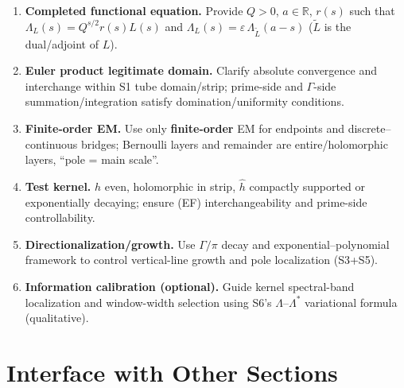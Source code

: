 \documentclass[11pt,a4paper]{article}
\theoremstyle{remark}
\begin{document}
\begin{enumerate}
\item \textbf{Completed functional equation.} Provide $Q>0$, $a\in\mathbb{R}$, $r(s)$ such that $\Lambda_{L}(s)=Q^{s/2}r(s)L(s)$ and $\Lambda_{L}(s)=\varepsilon\,\Lambda_{\tilde{L}}(a-s)$ ($\tilde{L}$ is the dual/adjoint of $L$).

\item \textbf{Euler product legitimate domain.} Clarify absolute convergence and interchange within S1 tube domain/strip; prime-side and $\Gamma$-side summation/integration satisfy domination/uniformity conditions.

\item \textbf{Finite-order EM.} Use only \textbf{finite-order} EM for endpoints and discrete--continuous bridges; Bernoulli layers and remainder are entire/holomorphic layers, ``pole = main scale''.

\item \textbf{Test kernel.} $h$ even, holomorphic in strip, $\widehat{h}$ compactly supported or exponentially decaying; ensure (EF) interchangeability and prime-side controllability.

\item \textbf{Directionalization/growth.} Use $\Gamma/\pi$ decay and exponential--polynomial framework to control vertical-line growth and pole localization (S3+S5).

\item \textbf{Information calibration (optional).} Guide kernel spectral-band localization and window-width selection using S6's $\Lambda$--$\Lambda^\ast$ variational formula (qualitative).
\end{enumerate}

\section{Interface with Other Sections}
\end{document}
